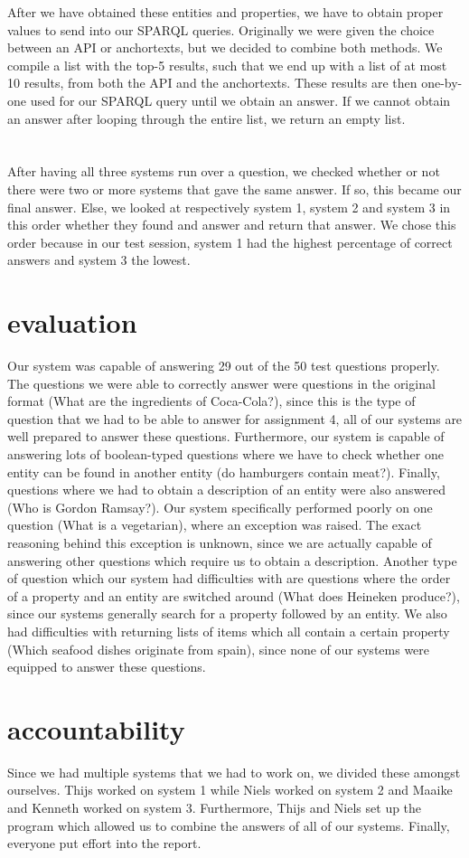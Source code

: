 \documentclass{article}
\begin{document}
After we have obtained these entities and properties, we have to obtain proper values to send into our SPARQL queries. Originally we were given the choice between an API or anchortexts, but we decided to combine both methods. We compile a list with the top-5 results, such that we end up with a list of at most 10 results, from both the API and the anchortexts. These results are then one-by-one used for our SPARQL query until we obtain an answer. If we cannot obtain an answer after looping through the entire list, we return an empty list.\\
\\
\\
After having all three systems run over a question, we checked whether or not there were two or more systems that gave the same answer. If so, this became our final answer. Else, we looked at respectively system 1, system 2 and system 3 in this order whether they found and answer and return that answer. We chose this order because in our test session, system 1 had the highest percentage of correct answers and system 3 the lowest.  

\section{evaluation}
Our system was capable of answering 29 out of the 50 test questions properly. The questions we were able to correctly answer were questions in the original format (What are the ingredients of Coca-Cola?), since this is the type of question that we had to be able to answer for assignment 4, all of our systems are well prepared to answer these questions. Furthermore, our system is capable of answering lots of boolean-typed questions where we have to check whether one entity can be found in another entity (do hamburgers contain meat?). Finally, questions where we had to obtain a description of an entity were also answered (Who is Gordon Ramsay?). Our system specifically performed poorly on one question (What is a vegetarian), where an exception was raised. The exact reasoning behind this exception is unknown, since we are actually capable of answering other questions which require us to obtain a description.
Another type of question which our system had difficulties with are questions where the order of a property and an entity are switched around (What does Heineken produce?), since our systems generally search for a property followed by an entity.
We also had difficulties with returning lists of items which all contain a certain property (Which seafood dishes originate from spain), since none of our systems were equipped to answer these questions.

\section{accountability}
Since we had multiple systems that we had to work on, we divided these amongst ourselves.
Thijs worked on system 1 while Niels worked on system 2 and Maaike and Kenneth worked on system 3.
Furthermore, Thijs and Niels set up the program which allowed us to combine the answers of all of our systems.
Finally, everyone put effort into the report.
\end{document}
